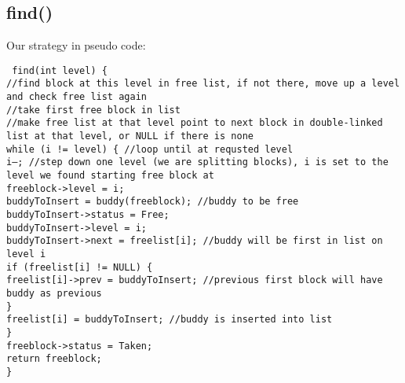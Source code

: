 \documentclass{article}
\def\code#1{\texttt{#1}}
\begin{document}
\subsection{find()}

Our strategy in pseudo code:

\noindent \code{	find(int level) \{  \\
\hspace*{2em}	//find block at this level in free list, if not there, move up a level and check free list again \\
\hspace*{2em}	//take first free block in list \\
\hspace*{2em}	//make free list at that level point to next block in double-linked list at that level, or NULL if there is none \\
\hspace*{2em} while (i != level) \{ //loop until at requsted level\\
\hspace*{4em}        i--; //step down one level (we are splitting blocks), i is set to the level we found starting free block at \\
\hspace*{4em}        freeblock->level = i; \\
\hspace*{4em}        buddyToInsert = buddy(freeblock); //buddy to be free \\
\hspace*{4em}        buddyToInsert->status = Free; \\
\hspace*{4em}        buddyToInsert->level = i; \\
\hspace*{4em}        buddyToInsert->next = freelist[i]; //buddy will be first in list on level i \\
\hspace*{4em}        if (freelist[i] != NULL) \{  \\
\hspace*{4em}            freelist[i]->prev = buddyToInsert; //previous first block will have buddy as previous \\
\hspace*{4em}      \} \\
\hspace*{4em}        freelist[i] = buddyToInsert; //buddy is inserted into list \\
\hspace*{2em}    \} \\
\hspace*{2em}    freeblock->status = Taken; \\
\hspace*{2em}	return freeblock; \\
	\}
}
\end{document}
